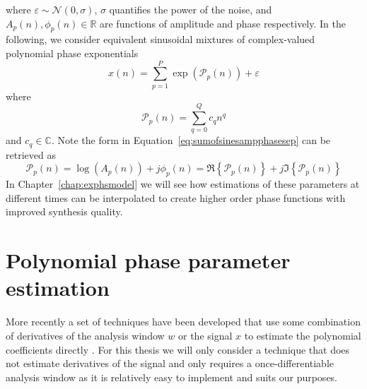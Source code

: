 where $\varepsilon \sim \mathcal{N}(0,\sigma)$, $\sigma$ quantifies the power of
the noise, and $A_{p}(n),\phi_{p}(n) \in \mathbb{R}$ are functions of amplitude and
phase respectively. In the following, we consider equivalent sinusoidal mixtures
of complex-valued polynomial phase exponentials
\begin{equation}
    x(n)=\sum_{p=1}^{P} \exp(\mathcal{P}_p(n)) + \varepsilon
\end{equation}
where
\begin{equation}
    \mathcal{P}_p(n) = \sum_{q=0}^{Q} c_q n^{q}
\end{equation}
and $c_q \in \mathbb{C}$. Note the form in
Equation~\ref{eq:sumofsinesampphasesep} can be retrieved as
\[
    \mathcal{P}_p(n) = \log(A_p(n)) +  j \phi_p(n) =
    \Re\left\{\mathcal{P}_p(n)\right\} +
    j\Im\left\{\mathcal{P}_p(n)\right\}
\]
In Chapter~\ref{chap:exphsmodel} we will see how estimations of these parameters
at different times can be interpolated to create higher order phase functions
with improved synthesis quality.

\section{Polynomial phase parameter estimation}
\label{sec:ddm_description}
More recently a set of techniques have been developed that use some combination
of derivatives of the analysis window $w$ or the signal $x$ to estimate the
polynomial coefficients directly \cite{hamilton2011non}. For this thesis we will
only consider a technique that does not estimate derivatives of the signal and
only requires a once-differentiable analysis window as it is relatively easy to
implement and suits our purposes.

